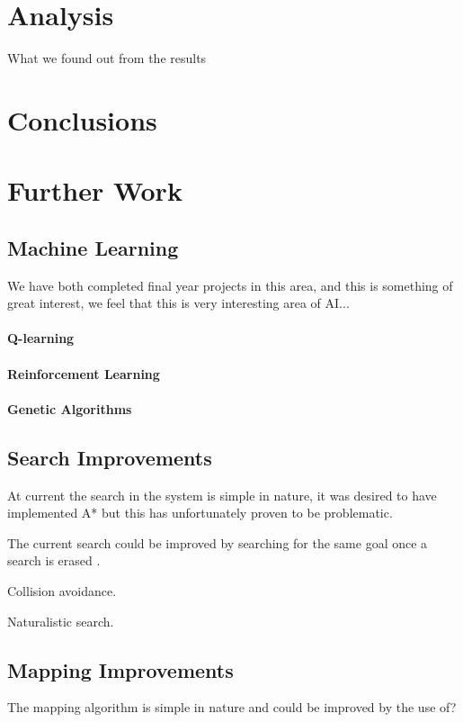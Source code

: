 \documentclass[a4paper,oneside]{report}
\begin{document}
\section{Analysis}

What we found out from the results

\section{Conclusions}

\section{Further Work}

\subsection{Machine Learning}
We have both completed final year projects in this area, and this is something of great interest, we feel that this is very interesting area of AI...

		
		
\paragraph{Q-learning}
		
\paragraph{Reinforcement Learning}
		
\paragraph{Genetic Algorithms}
	
\subsection{Search Improvements}
		At current the search in the system is simple in nature, it was desired to have implemented A* but this has unfortunately proven to be problematic.
		
		The current search could be improved by searching for the same goal once a search is erased .
		
		
		Collision avoidance.
		
		Naturalistic search. 
		
	\subsection{Mapping Improvements}
		The mapping algorithm is simple in nature and could be improved by the use of? 
		
\end{document}
